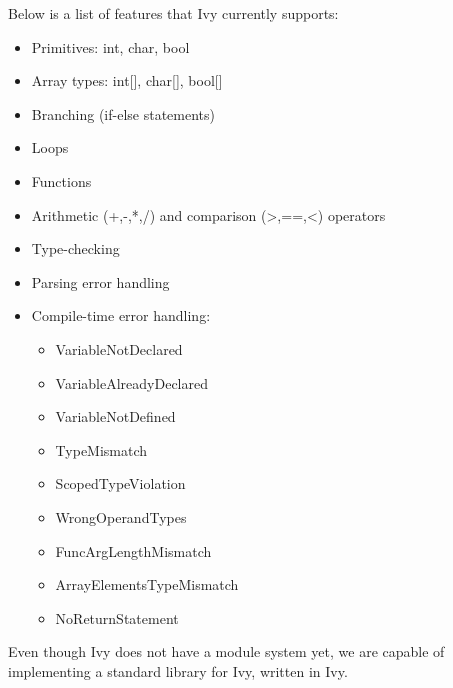 \documentclass[landscape,a1paper,fontscale=0.485]{baposter} %
\begin{document}
\begin{poster}
{Below is a list of features that Ivy currently supports:
\begin{itemize}
\item Primitives: int, char, bool
\item Array types: int[], char[], bool[]
\item Branching (if-else statements)
\item Loops
\item Functions
\item Arithmetic (+,-,*,/) and comparison (>,==,<) operators
\item Type-checking
\item Parsing error handling
\item Compile-time error handling:
\begin{itemize}
  \item VariableNotDeclared
  \item VariableAlreadyDeclared
  \item VariableNotDefined
  \item TypeMismatch
  \item ScopedTypeViolation
  \item WrongOperandTypes
  \item FuncArgLengthMismatch
  \item ArrayElementsTypeMismatch
  \item NoReturnStatement
\end{itemize}
\end{itemize}
}

Even though Ivy does not have a module system yet, we are capable of implementing a standard library for Ivy, written in Ivy.

\end{poster}
\end{document}
